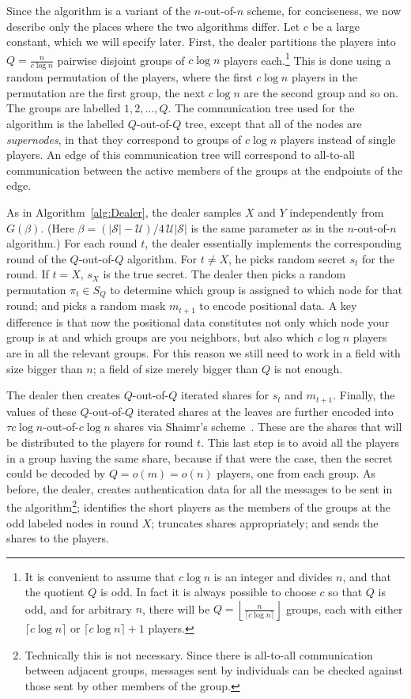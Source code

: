 \documentclass[12pt]{article}
\theoremstyle{definition}
\newcommand{\U}{\mathcal{U}}
\renewcommand{\S}{\mathcal{S}}
\begin{document}
Since the algorithm is a variant of the $n$-out-of-$n$ scheme, for
conciseness, we now describe only the places where the two algorithms
differ.  Let $c$ be a large constant, which we will specify later.
First, the dealer partitions the players into $Q= \frac{n}{c\log n}$
pairwise disjoint groups of $c\log n$ players each.\footnote{It is
  convenient to assume that $c\log n$ is an integer and divides
  $n$, and that the quotient $Q$ is odd. In fact it is always possible 
  to choose $c$ so that $Q$ is odd, and for arbitrary $n$, there will be 
  $Q =\left\lfloor \frac{n}{\lceil c\log n \rceil} \right\rfloor$ groups, each 
  with either $\lceil c\log n \rceil$ or $\lceil c\log n \rceil +1$
  players.}  This is done using a random permutation of the
players, where the first $c\log n$ players in the permutation are the first
group, the next $c\log n$ are the second group and so on. The groups
are labelled $1, 2,\dots, Q$. The communication tree used for the 
algorithm is the labelled $Q$-out-of-$Q$ tree, except that all of the 
nodes are \emph{supernodes}, in that they
correspond to groups of $c\log n$ players instead of single
players. An edge of this communication tree will correspond to all-to-all
communication between the active members of the groups at the endpoints 
of the edge.

As in Algorithm~\ref{alg:Dealer}, the dealer samples $X$ and $Y$ independently
from $G(\beta)$. (Here $\beta = (|\S|-\U)/4\,\U |\S|$ is the same parameter 
as in the $n$-out-of-$n$ algorithm.) For each round $t$, the dealer essentially 
implements the corresponding round of the $Q$-out-of-$Q$ algorithm.  For $t \neq X$, he picks 
random secret $s_t$ for the round.  If $t = X$, $s_X$ is the true secret.  The dealer then picks a random permutation $\pi_t \in S_Q$ to determine which group is 
assigned to which node for that round; and picks a random mask $m_{t+1}$ to encode 
positional data.  A key difference is that now the positional data  constitutes 
not only which node your group is at and which groups are you neighbors, but 
also which $c\log n$ players are in all the relevant groups. For this reason 
we still need to work in a field with size bigger than $n$; a field of size 
merely bigger than $Q$ is not enough.

The dealer then creates $Q$-out-of-$Q$ iterated shares for $s_t$ and $m_{t+1}$. Finally, the values of these 
$Q$-out-of-$Q$ iterated shares at the leaves are further encoded into 
$\tau c\log n$-out-of-$c\log n$ shares via Shaimr's scheme~\cite{shamir:how}. 
These are the shares that will be distributed to the players for round $t$.
This last step is to avoid all the players in a group having the same share,
because if that were the case, then the secret could be decoded by 
$Q= o(m) =o(n)$ players, one from each group. As before, the dealer, creates 
authentication data for all the messages to be sent in the algorithm\footnote{Technically this is not necessary. Since there is all-to-all 
communication between adjacent groups, messages sent by individuals can be 
checked against those sent by other members of the group.};
identifies the short players as the members of the groups at the odd labeled 
nodes in round $X$; truncates shares appropriately; and sends the shares to 
the players.
\end{document}
